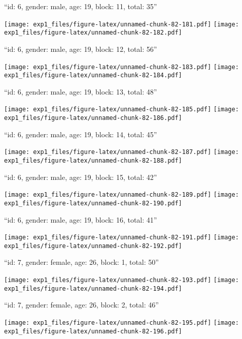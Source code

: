 \documentclass[11pt,,]{article}
\begin{document}
\newpage
[1] 

``id: 6, gender: male, age: 19, block: 11, total: 35''

\texttt{[image: exp1\_files/figure-latex/unnamed-chunk-82-181.pdf]}
\texttt{[image: exp1\_files/figure-latex/unnamed-chunk-82-182.pdf]}

\newpage
[1] 

``id: 6, gender: male, age: 19, block: 12, total: 56''

\texttt{[image: exp1\_files/figure-latex/unnamed-chunk-82-183.pdf]}
\texttt{[image: exp1\_files/figure-latex/unnamed-chunk-82-184.pdf]}

\newpage
[1] 

``id: 6, gender: male, age: 19, block: 13, total: 48''

\texttt{[image: exp1\_files/figure-latex/unnamed-chunk-82-185.pdf]}
\texttt{[image: exp1\_files/figure-latex/unnamed-chunk-82-186.pdf]}

\newpage
[1] 

``id: 6, gender: male, age: 19, block: 14, total: 45''

\texttt{[image: exp1\_files/figure-latex/unnamed-chunk-82-187.pdf]}
\texttt{[image: exp1\_files/figure-latex/unnamed-chunk-82-188.pdf]}

\newpage
[1] 

``id: 6, gender: male, age: 19, block: 15, total: 42''

\texttt{[image: exp1\_files/figure-latex/unnamed-chunk-82-189.pdf]}
\texttt{[image: exp1\_files/figure-latex/unnamed-chunk-82-190.pdf]}

\newpage
[1] 

``id: 6, gender: male, age: 19, block: 16, total: 41''

\texttt{[image: exp1\_files/figure-latex/unnamed-chunk-82-191.pdf]}
\texttt{[image: exp1\_files/figure-latex/unnamed-chunk-82-192.pdf]}

\newpage
[1] 

``id: 7, gender: female, age: 26, block: 1, total: 50''

\texttt{[image: exp1\_files/figure-latex/unnamed-chunk-82-193.pdf]}
\texttt{[image: exp1\_files/figure-latex/unnamed-chunk-82-194.pdf]}

\newpage
[1] 

``id: 7, gender: female, age: 26, block: 2, total: 46''

\texttt{[image: exp1\_files/figure-latex/unnamed-chunk-82-195.pdf]}
\texttt{[image: exp1\_files/figure-latex/unnamed-chunk-82-196.pdf]}
\end{document}
